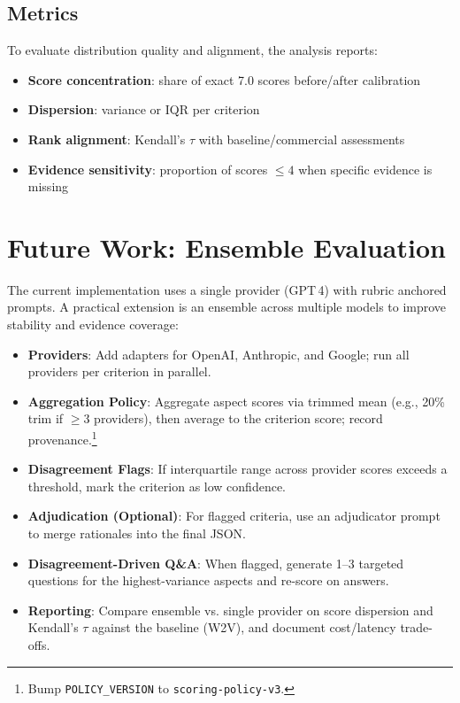 \subsection{Metrics}
To evaluate distribution quality and alignment, the analysis reports:
\begin{itemize}
  \item \textbf{Score concentration}: share of exact 7.0 scores before/after calibration
  \item \textbf{Dispersion}: variance or IQR per criterion
  \item \textbf{Rank alignment}: Kendall's $\tau$ with baseline/commercial assessments
  \item \textbf{Evidence sensitivity}: proportion of scores $\leq 4$ when specific evidence is missing
\end{itemize}

\section{Future Work: Ensemble Evaluation}
The current implementation uses a single provider (GPT\,4) with rubric anchored prompts. A practical extension is an ensemble across multiple models to improve stability and evidence coverage:
\begin{itemize}
  \item \textbf{Providers}: Add adapters for OpenAI, Anthropic, and Google; run all providers per criterion in parallel.
  \item \textbf{Aggregation Policy}: Aggregate aspect scores via trimmed mean (e.g., 20\% trim if $\geq$3 providers), then average to the criterion score; record provenance.\footnote{Bump \texttt{POLICY\_VERSION} to \texttt{scoring-policy-v3}.}
  \item \textbf{Disagreement Flags}: If interquartile range across provider scores exceeds a threshold, mark the criterion as low confidence.
  \item \textbf{Adjudication (Optional)}: For flagged criteria, use an adjudicator prompt to merge rationales into the final JSON.
  \item \textbf{Disagreement-Driven Q\&A}: When flagged, generate 1--3 targeted questions for the highest-variance aspects and re-score on answers.
  \item \textbf{Reporting}: Compare ensemble vs. single provider on score dispersion and Kendall's $\tau$ against the baseline (W2V), and document cost/latency trade-offs.
\end{itemize}

